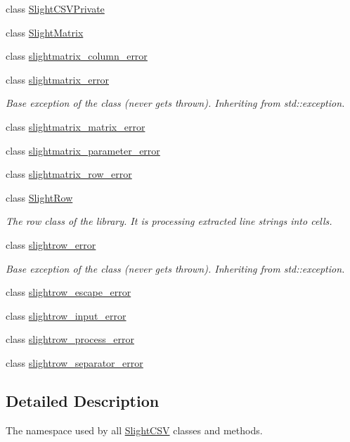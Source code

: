 \begin{DoxyCompactItemize}
\item 
class \hyperlink{classutils_1_1SlightCSVPrivate}{Slight\+C\+S\+V\+Private}
\item 
class \hyperlink{classutils_1_1SlightMatrix}{Slight\+Matrix}
\item 
class \hyperlink{classutils_1_1slightmatrix__column__error}{slightmatrix\+\_\+column\+\_\+error}
\item 
class \hyperlink{classutils_1_1slightmatrix__error}{slightmatrix\+\_\+error}
\begin{DoxyCompactList}\small\item\em Base exception of the class (never gets thrown). Inheriting from std\+::exception. \end{DoxyCompactList}\item 
class \hyperlink{classutils_1_1slightmatrix__matrix__error}{slightmatrix\+\_\+matrix\+\_\+error}
\item 
class \hyperlink{classutils_1_1slightmatrix__parameter__error}{slightmatrix\+\_\+parameter\+\_\+error}
\item 
class \hyperlink{classutils_1_1slightmatrix__row__error}{slightmatrix\+\_\+row\+\_\+error}
\item 
class \hyperlink{classutils_1_1SlightRow}{Slight\+Row}
\begin{DoxyCompactList}\small\item\em The row class of the library. It is processing extracted line strings into cells. \end{DoxyCompactList}\item 
class \hyperlink{classutils_1_1slightrow__error}{slightrow\+\_\+error}
\begin{DoxyCompactList}\small\item\em Base exception of the class (never gets thrown). Inheriting from std\+::exception. \end{DoxyCompactList}\item 
class \hyperlink{classutils_1_1slightrow__escape__error}{slightrow\+\_\+escape\+\_\+error}
\item 
class \hyperlink{classutils_1_1slightrow__input__error}{slightrow\+\_\+input\+\_\+error}
\item 
class \hyperlink{classutils_1_1slightrow__process__error}{slightrow\+\_\+process\+\_\+error}
\item 
class \hyperlink{classutils_1_1slightrow__separator__error}{slightrow\+\_\+separator\+\_\+error}
\end{DoxyCompactItemize}


\subsection{Detailed Description}
The namespace used by all \hyperlink{classutils_1_1SlightCSV}{Slight\+C\+SV} classes and methods. 